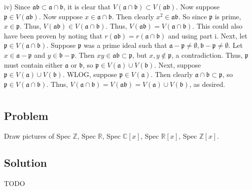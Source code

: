 \documentclass[book,12pt,oneside,openany]{memoir}
\begin{document}
iv) Since $\mathfrak{ab} \subset \mathfrak{a} \cap \mathfrak{b}$, it is clear that $V(\mathfrak{a} \cap \mathfrak{b}) \subset V(\mathfrak{ab})$. Now suppose $\mathfrak{p} \in V(\mathfrak{ab})$. Now suppose $x \in \mathfrak{a} \cap \mathfrak{b}$. Then clearly $x^2 \in \mathfrak{a}\mathfrak{b}$. So since $\mathfrak{p}$ is prime, $x \in \mathfrak{p}$. Thus, $V(\mathfrak{ab}) \in V(\mathfrak{a} \cap \mathfrak{b})$. Thus, $V(\mathfrak{ab}) = V(\mathfrak{a} \cap \mathfrak{b})$. This could also have been proven by noting that $r(\mathfrak{ab})  = r(\mathfrak{a} \cap \mathfrak{b})$ and using part i. Next, let $\mathfrak{p} \in V(\mathfrak{a} \cap \mathfrak{b})$. Suppose $\mathfrak{p}$ was a prime ideal such that $\mathfrak{a} - \mathfrak{p} \neq \emptyset, \mathfrak{b} - \mathfrak{p} \neq \emptyset$. Let $x \in \mathfrak{a} - \mathfrak{p}$ and $y \in \mathfrak{b} - \mathfrak{p}$. Then $xy \in \mathfrak{ab} \subset \mathfrak{p}$, but $x,y \notin \mathfrak{p}$, a contradiction. Thus, $\mathfrak{p}$ must contain either $\mathfrak{a}$ or $\mathfrak{b}$, so $\mathfrak{p} \in V(\mathfrak{a}) \cup V(\mathfrak{b})$. Next, suppose $\mathfrak{p} \in V(\mathfrak{a}) \cup V(\mathfrak{b})$. WLOG, suppose $\mathfrak{p} \in V(\mathfrak{a})$. Then clearly $\mathfrak{a} \cap \mathfrak{b} \subset \mathfrak{p}$, so $\mathfrak{p} \in V(\mathfrak{a} \cap \mathfrak{b})$. Thus, $V(\mathfrak{a} \cap \mathfrak{b}) = V(\mathfrak{a}\mathfrak{b}) = V(\mathfrak{a}) \cup V(\mathfrak{b})$, as desired.


\section{}
\subsection{Problem}
Draw pictures of Spec $\mathbb{Z}$, Spec $\mathbb{R}$, Spec $\mathbb{C}[x]$, Spec $\mathbb{R}[x]$, Spec $\mathbb{Z}[x]$.
\subsection{Solution}
TODO


\section{}
\end{document}
